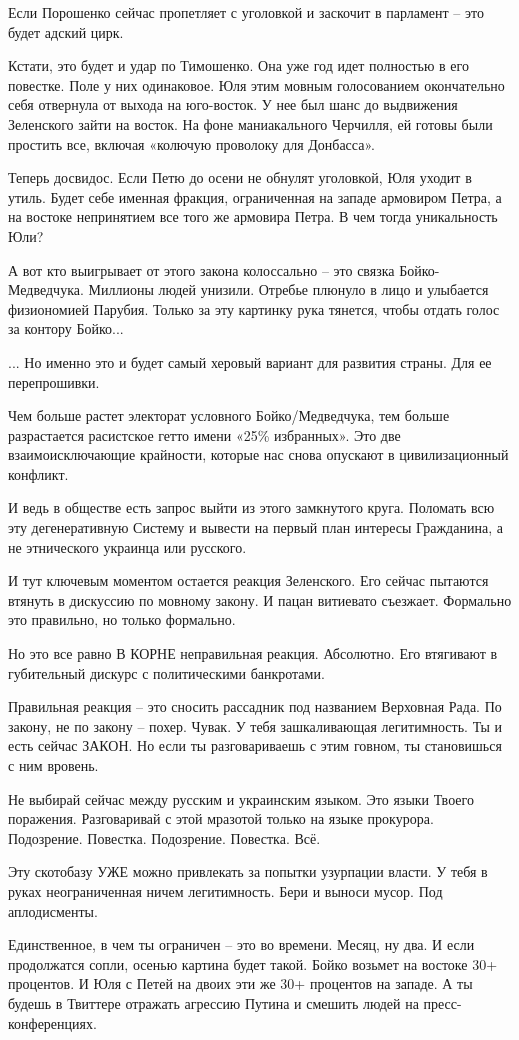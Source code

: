 Если Порошенко сейчас пропетляет с уголовкой и заскочит в парламент – это будет
адский цирк.

Кстати, это будет и удар по Тимошенко. Она уже год идет полностью в его
повестке. Поле у них одинаковое. Юля этим мовным голосованием окончательно себя
отвернула от выхода на юго-восток. У нее был шанс до выдвижения Зеленского
зайти на восток. На фоне маниакального Черчилля, ей готовы были простить все,
включая «колючую проволоку для Донбасса».

Теперь досвидос. Если Петю до осени не обнулят уголовкой, Юля уходит в утиль.
Будет себе именная фракция, ограниченная на западе армовиром Петра, а на
востоке непринятием все того же армовира Петра. В чем тогда уникальность Юли?

А вот кто выигрывает от этого закона колоссально – это связка Бойко-Медведчука.
Миллионы людей унизили. Отребье плюнуло в лицо и улыбается физиономией Парубия.
Только за эту картинку рука тянется, чтобы отдать голос за контору Бойко...

... Но именно это и будет самый херовый вариант для развития страны. Для ее
перепрошивки.

Чем больше растет электорат условного Бойко/Медведчука, тем больше разрастается
расистское гетто имени «25\% избранных». Это две взаимоисключающие крайности,
которые нас снова опускают в цивилизационный конфликт.

И ведь в обществе есть запрос выйти из этого замкнутого круга. Поломать всю эту
дегенеративную Систему и вывести на первый план интересы Гражданина, а не
этнического украинца или русского.

И тут ключевым моментом остается реакция Зеленского. Его сейчас пытаются
втянуть в дискуссию по мовному закону. И пацан витиевато съезжает. Формально
это правильно, но только формально.

Но это все равно В КОРНЕ неправильная реакция. Абсолютно. Его втягивают в
губительный дискурс с политическими банкротами.

Правильная реакция – это сносить рассадник под названием Верховная Рада. По
закону, не по закону – похер. Чувак. У тебя зашкаливающая легитимность. Ты и
есть сейчас ЗАКОН. Но если ты разговариваешь с этим говном, ты становишься с
ним вровень.

Не выбирай сейчас между русским и украинским языком. Это языки Твоего
поражения. Разговаривай с этой мразотой только на языке прокурора. Подозрение.
Повестка. Подозрение. Повестка. Всё.

Эту скотобазу УЖЕ можно привлекать за попытки узурпации власти. У тебя в руках
неограниченная ничем легитимность. Бери и выноси мусор. Под аплодисменты.

Единственное, в чем ты ограничен – это во времени. Месяц, ну два. И если
продолжатся сопли, осенью картина будет такой. Бойко возьмет на востоке 30+
процентов. И Юля с Петей на двоих эти же 30+ процентов на западе. А ты будешь в
Твиттере отражать агрессию Путина и смешить людей на пресс-конференциях.
